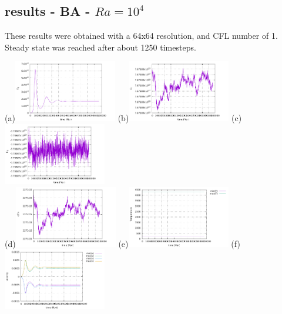 \newpage
\subsection{results - BA - $Ra=10^4$}

These results were obtained with a 64x64 resolution, and CFL number of 1. Steady state was reached 
after about 1250 timesteps.

\begin{center}
(a)\includegraphics[width=4.5cm]{python_codes/fieldstone_compressible2/BA_104/EK}
(b)\includegraphics[width=4.5cm]{python_codes/fieldstone_compressible2/BA_104/ET}
(c)\includegraphics[width=4.5cm]{python_codes/fieldstone_compressible2/BA_104/EG}\\
(d)\includegraphics[width=4.5cm]{python_codes/fieldstone_compressible2/BA_104/Tavrg}
(e)\includegraphics[width=4.5cm]{python_codes/fieldstone_compressible2/BA_104/T_stats}
(f)\includegraphics[width=4.5cm]{python_codes/fieldstone_compressible2/BA_104/vel_stats}\\

\end{center}
